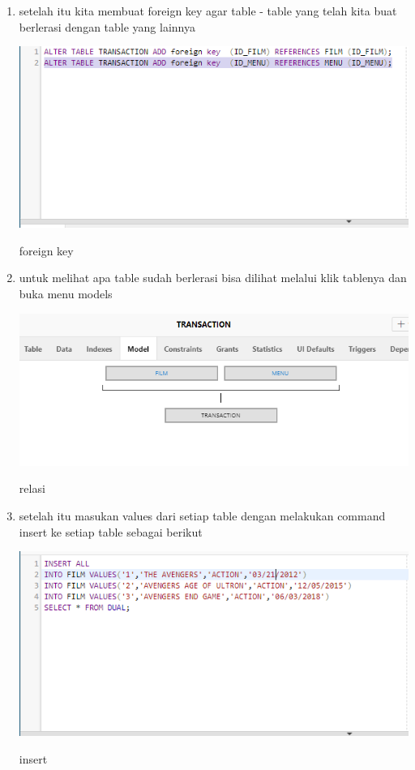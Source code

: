 \documentclass{article}
\begin{document}
\begin{enumerate}
    \item setelah itu kita membuat foreign key agar table - table yang telah kita buat berlerasi dengan table yang lainnya
    \begin{center}
         \centering
            \includegraphics[scale=0.27]{figures/5.PNG}
        \caption{foreign key }
        \label{create}
    \end{center}
    
    \item untuk melihat apa table sudah berlerasi bisa dilihat melalui klik tablenya dan buka menu models
    \begin{center}
         \centering
            \includegraphics[scale=0.27]{figures/6.PNG}
        \caption{relasi }
        \label{create}
    \end{center}
    
    \item setelah itu masukan values dari setiap table dengan melakukan command insert ke setiap table sebagai berikut
    \begin{center}
         \centering
            \includegraphics[scale=0.27]{figures/7.PNG}
        \caption{insert }
        \label{create}
    \end{center}
    

\end{enumerate}
\end{document}
